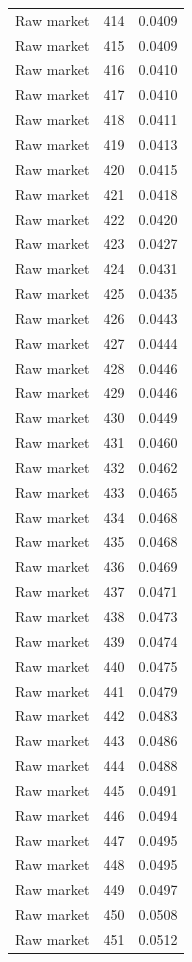 \begin{table}[htbp]
\begin{tabular}{lll}
Raw market & 414 & 0.0409 \\
Raw market & 415 & 0.0409 \\
Raw market & 416 & 0.0410 \\
Raw market & 417 & 0.0410 \\
Raw market & 418 & 0.0411 \\
Raw market & 419 & 0.0413 \\
Raw market & 420 & 0.0415 \\
Raw market & 421 & 0.0418 \\
Raw market & 422 & 0.0420 \\
Raw market & 423 & 0.0427 \\
Raw market & 424 & 0.0431 \\
Raw market & 425 & 0.0435 \\
Raw market & 426 & 0.0443 \\
Raw market & 427 & 0.0444 \\
Raw market & 428 & 0.0446 \\
Raw market & 429 & 0.0446 \\
Raw market & 430 & 0.0449 \\
Raw market & 431 & 0.0460 \\
Raw market & 432 & 0.0462 \\
Raw market & 433 & 0.0465 \\
Raw market & 434 & 0.0468 \\
Raw market & 435 & 0.0468 \\
Raw market & 436 & 0.0469 \\
Raw market & 437 & 0.0471 \\
Raw market & 438 & 0.0473 \\
Raw market & 439 & 0.0474 \\
Raw market & 440 & 0.0475 \\
Raw market & 441 & 0.0479 \\
Raw market & 442 & 0.0483 \\
Raw market & 443 & 0.0486 \\
Raw market & 444 & 0.0488 \\
Raw market & 445 & 0.0491 \\
Raw market & 446 & 0.0494 \\
Raw market & 447 & 0.0495 \\
Raw market & 448 & 0.0495 \\
Raw market & 449 & 0.0497 \\
Raw market & 450 & 0.0508 \\
Raw market & 451 & 0.0512 \\

\end{tabular}
\end{table}
